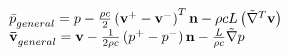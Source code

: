 \documentclass{minimal}
\begin{document}
 \begin{align*}
\begin{array}{l} 
  \bar p_{general}^{}{\rm{ }} = {\rm{ }}p{\rm{ }} - {\rm{ }}\frac{{\rho c}}{2}\left( {{\mathbf{v}}_{}^ +  - {\mathbf{v}}_{}^ - } \right)_{}^T{\mathbf{n}}{\rm{  }} - {\rm{ }}\rho cL\left( {\tilde \nabla _{}^T{\mathbf{v}}} \right)\\ 
  {\mathbf{\bar v}}_{general}^{}{\rm{ }} = {\rm{ }}{\mathbf{v}}{\rm{ }} - {\rm{ }}\frac{1}{{2\rho c}}\left( {p_{}^ +  - p_{}^ - } \right){\mathbf{n}}{\rm{ }} - {\rm{ }}\frac{L}{{\rho c}}\tilde \nabla p 
  \end{array}
 \end{align*}
 
\end{document}
